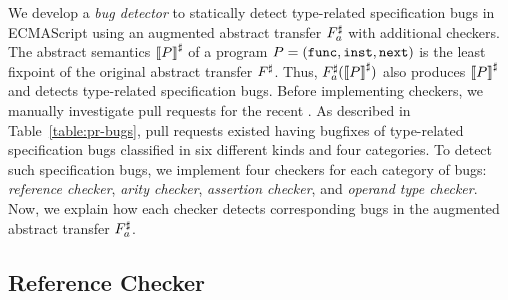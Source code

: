 We develop a \textit{bug detector} to statically detect type-related
specification bugs in ECMAScript using an augmented abstract transfer
${F}^\sharp_a$ with additional checkers.  The abstract semantics ${\llbracket{P}\rrbracket}^\sharp$ of
a program $P = (\mathtt{func}, \mathtt{inst}, \mathtt{next})$ is the least fixpoint of the
original abstract transfer ${F}^\sharp$.  Thus, ${F}^\sharp_a({\llbracket{P}\rrbracket}^\sharp)$ also
produces ${\llbracket{P}\rrbracket}^\sharp$ and detects type-related specification bugs.  Before
implementing checkers, we manually investigate pull requests for the recent
.  As described in
Table~\ref{table:pr-bugs},  pull requests existed having bugfixes of
 type-related specification bugs classified in six different kinds
and four categories.  To detect such specification bugs, we implement four
checkers for each category of bugs: \textit{reference checker}, \textit{arity
checker}, \textit{assertion checker}, and \textit{operand type checker}.  Now,
we explain how each checker detects corresponding bugs in the augmented abstract
transfer ${F}^\sharp_a$.


\subsection{Reference Checker}

